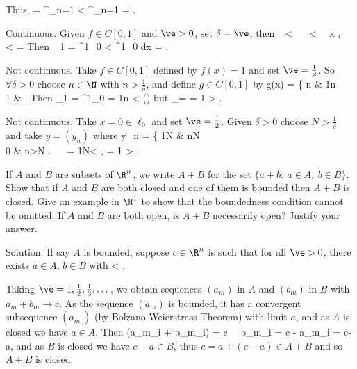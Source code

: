 Thus,
\be
{} =  \leq {} \sum^\infty_{n=1}  < \sum^\infty_{n=1}  = \ve.
\ee

\item [(ii)] Continuous. Given $f\in C[0,1]$ and $\ve>0$, set $\delta = \ve$, then 
\be
{}_\infty < \delta \ \ra \ \sup{} < \delta \ \ra \ \forall x \in [0,1], \  < \delta = \ve
\ee
Then
\be
{}_1 = \int^1_0  < \int^1_0 \ve dx = \ve.
\ee

\item [(iii)] Not continuous. Take $f\in C[0,1]$ defined by $f(x)=1$ and set $\ve = \frac 12$. So $\forall \delta >0$ choose $n\in\N$ with $n> \frac 1{\delta}$, and define $g\in C[0,1]$ by 
\be
g(x) = \left\{
n \quad\quad & \leq \frac 1n\\
1 & 
\ea\right.
\ee
Then 
\be
{}_1 = \int^1_0  = \frac 1n < \delta \quad ()
\ee
but 
\be
{}_\infty = \sup{} = 1 > \ve.
\ee

\item [(iv)] Not continuous. Take $x=0\in \ell_0$ and set $\ve= \frac 12$. Given $\delta>0$ choose $N>\frac 1{\delta}$ and take $y=(y_n)$ where 
\be
y_n = \left\{
\frac 1N \quad\quad & n\leq N\\
0 & n>N
\ea\right. \ \ra \  = \frac 1N< \delta, \quad \quad {}  = 1 > \ve.
\ee

\een

\begin{exercise}
If $A$ and $B$ are subsets of $\R^n$, we write $A + B$ for the set $\{a + b :\ a \in A,\ b \in B\}$. Show that if $A$ and $B$ are both closed and one of them is bounded then $A + B$ is closed. Give an example in $\R^1$ to show that the boundedness condition cannot be omitted. If $A$ and $B$ are both open, is $A + B$ necessarily open? Justify your answer.
\end{exercise}

Solution. If say $A$ is bounded, suppose $c\in \R^n$ is such that for all $\ve>0$, there exists $a\in A$, $b\in B$ with 
\be
{} < \ve.
\ee

Taking $\ve = 1,\frac 12,\frac 13,\dots$, we obtain sequences $(a_m)$ in $A$ and $(b_m)$ in $B$ with $a_m+b_m\to c$. As the sequence $(a_m)$ is bounded, it has a convergent subsequence $(a_{m_i})$ (by Bolzano-Weierstrass Theorem) with limit $a$, and as $A$ is closed we have $a\in A$. Then
\be
\lim (a_{m_i} + b_{m_i}) = c \ \ra \ \lim b_{m_i} = c - \lim a_{m_i} = c-a, 
\ee
and as $B$ is closed we have $c-a \in B$, thus $c=a+(c-a) \in A+B$ and so $A+B$ is closed.

